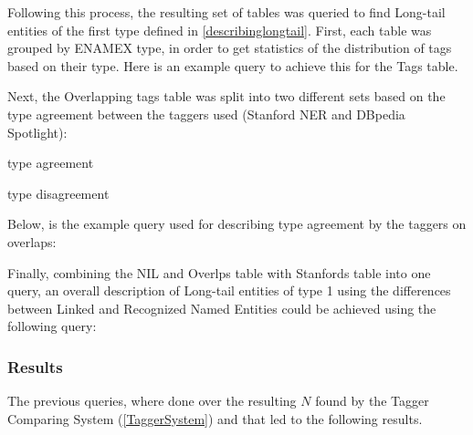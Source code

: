 Following this process, the resulting set of tables was queried to find Long-tail entities of the first type defined in \ref{describinglongtail}. 
First, each table was grouped by ENAMEX type, in order to get statistics of the distribution of tags based on their type.
Here is an example query to achieve this for the Tags table.

Next, the Overlapping tags table was split into two different sets based on the type agreement between the taggers used (Stanford NER and DBpedia Spotlight):
\begin{enumerate*}
  \item type agreement
  \item type disagreement
\end{enumerate*}
Below, is the example query used for describing type agreement by the taggers on overlaps:

Finally, combining the NIL and Overlps table with Stanfords table into one query, an overall description of Long-tail entities of type 1 using the differences
between Linked and Recognized Named Entities could be achieved using the following query:


\subsubsection{Results}
The previous queries, where done over the resulting $N$ found by the Tagger Comparing System (\ref{TaggerSystem}) and that led to the following results.


%




